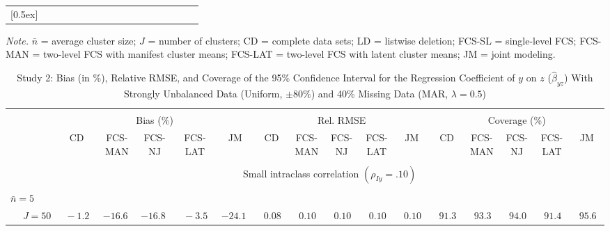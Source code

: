 \begin{sidewaystable}
\begin{threeparttable}
\begin{tabular}{llccccccccccccccc}
[0.5ex]\hline\\[-1.6ex] 
\end{tabular}
\begin{tablenotes}{\footnotesize \textit{Note.} $\bar{n}$ = average cluster size; $J$ = number of clusters; CD = complete data sets; LD = listwise deletion; FCS-SL = single-level FCS; FCS-MAN = two-level FCS with manifest cluster means; FCS-LAT = two-level FCS with latent cluster means; JM = joint modeling.}\end{tablenotes}
\end{threeparttable}
\end{sidewaystable}
\begin{sidewaystable}
\begin{threeparttable}
\setlength{\tabcolsep}{1.0pt}
\renewcommand{\arraystretch}{0.95}
\footnotesize
\caption{\small Study 2: Bias (in \%), Relative RMSE, and Coverage of the 95\% Confidence Interval for the Regression Coefficient of $y$ on $z$ ($\hat\beta_{yz}$) With Strongly Unbalanced Data (Uniform, $\pm 80\%$) and 40\% Missing Data (MAR, $\lambda=0.5$)}
\begin{tabular}{llccccccccccccccc}
\hline\\[-1.8ex]
& & \multicolumn{5}{c}{Bias (\%)} & \multicolumn{5}{c}{Rel. RMSE} & \multicolumn{5}{c}{Coverage (\%)} \\ \cmidrule(r){3-7}\cmidrule(r){8-12}\cmidrule(r){13-17}
 &  & CD & \makecell{FCS-\\MAN} & \makecell{FCS-\\NJ} & \makecell{FCS-\\LAT} & JM & CD & \makecell{FCS-\\MAN} & \makecell{FCS-\\NJ} & \makecell{FCS-\\LAT} & JM & CD & \makecell{FCS-\\MAN} & \makecell{FCS-\\NJ} & \makecell{FCS-\\LAT} & \multicolumn{1}{c}{JM} \\ 
[0.4ex]\hline\\[-1.8ex]
& & \multicolumn{15}{c}{Small intraclass correlation $(\rho_{Iy}=.10)$} \\[0.6ex]\hline\\[-1.8ex]
\multicolumn{4}{l}{$\bar{n}=5$} \\  & \nopagebreak $\;J=50$  & $\phantom{0}{-}1.2\phantom{0}$ & ${-}16.6\phantom{0}$ & ${-}16.8\phantom{0}$ & $\phantom{0}{-}3.5\phantom{0}$ & ${-}24.1\phantom{0}$ & $\phantom{0}0.08\phantom{0}$ & $\phantom{0}0.10\phantom{0}$ & $\phantom{0}0.10\phantom{0}$ & $\phantom{0}0.10\phantom{0}$ & $\phantom{0}0.10\phantom{0}$ & $\phantom{0}91.3\phantom{0}$ & $\phantom{0}93.3\phantom{0}$ & $\phantom{0}94.0\phantom{0}$ & $\phantom{0}91.4\phantom{0}$ & $\phantom{0}95.6\phantom{0}$ \\

\end{tabular}
\end{threeparttable}
\end{sidewaystable}
